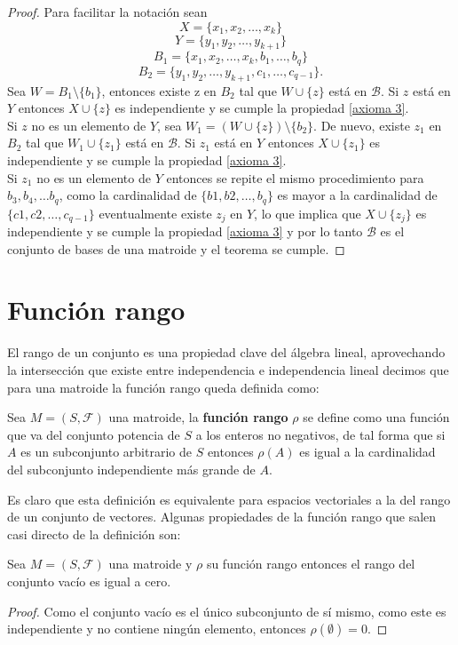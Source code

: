 \begin{proof}
Para facilitar la notación sean 
$$X = \{ x_1, x_2, \dots, x_k\}$$
$$Y = \{ y_1, y_2, \dots, y_{k+1}\}$$
$$B_1 = \{x_1, x_2, \dots, x_k, b_1, \dots, b_q \}$$
$$B_2 = \{y_1, y_2, \dots, y_{k+1}, c_1, \dots, c_{q-1} \}.$$
Sea $W = B_1 \setminus\{ b_1 \} $, entonces existe z en $B_2$ tal que $W \cup \{z\}$ está en $\mathcal{B}$. Si $z$ está en $Y$ entonces $X \cup \{z\}$ es independiente y se cumple la propiedad \ref{axioma 3}. \\
Si $z$ no es un elemento de $Y$, sea $W_1= (W \cup \{ z \}) \setminus \{ b_2 \}$. De nuevo, existe $z_1$ en $B_2$ tal que $W_1 \cup \{ z_1 \}$ está en $\mathcal{B}$. Si $z_1$ está en $Y$ entonces $X \cup \{z_1\}$ es independiente y se cumple la propiedad \ref{axioma 3}. \\
Si $z_1$ no es un elemento de $Y$ entonces se repite el mismo procedimiento para $b_3, b_4, \dots b_q$, como la cardinalidad de $\{ b1, b2, \dots, b_q\}$ es mayor a la cardinalidad de $\{c1,c2, \dots, c_{q-1}\}$ eventualmente existe $z_j$ en $Y$, lo que implica que $X \cup \{z_j\}$ es independiente y se cumple la propiedad \ref{axioma 3} y por lo tanto $\mathcal{B}$ es el conjunto de bases de una matroide y el teorema se cumple. 
\end{proof}

\section{Función rango}
El rango de un conjunto es una propiedad clave del álgebra lineal, aprovechando la intersección que existe entre independencia e independencia lineal decimos que para una matroide la función rango queda definida como: 

\begin{dfn}
Sea $M=(S,\mathcal{F})$ una matroide, la \textbf{función rango} $\rho$ se define como una función que va del conjunto potencia de $S$ a los enteros no negativos, de tal forma que si $A$ es un subconjunto arbitrario de $S$ entonces $\rho(A)$ es igual a la cardinalidad del subconjunto independiente más grande de $A$.
\end{dfn}

Es claro que esta definición es equivalente para espacios vectoriales a la del rango de un conjunto de vectores. Algunas propiedades de la función rango que salen casi directo de la definición son:
\begin{cor}\label{R1}
Sea $M=(S,\mathcal{F})$ una matroide y $\rho$ su función rango entonces
el rango del conjunto vacío es igual a cero. 
\end{cor}
\begin{proof} Como el conjunto vacío es el único subconjunto de sí mismo, como este es independiente y no contiene ningún elemento, entonces $\rho(\emptyset)=0$. \end{proof}

